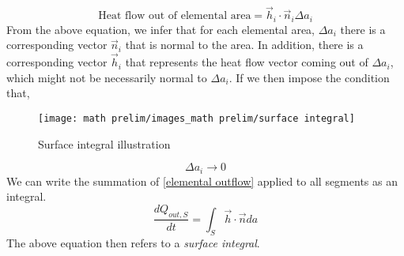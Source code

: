 \begin{equation}
	\label{elemental outflow}
	\text{Heat flow out of elemental area} = \vec{h}_{i} \cdot \vec{n}_{i} \Delta a_{i}
\end{equation}
From the above equation, we infer that for each elemental area, $\Delta a_{i}$ there is a corresponding vector $\vec{n}_{i}$ that is normal to the area. In addition, there is a corresponding vector $\vec{h}_{i}$ that represents the heat flow vector coming out of $\Delta a_{i}$, which might not be necessarily normal to $\Delta a_{i}$. If we then impose the condition that, 
\begin{figure}[H]
    \centering
    \texttt{[image: math prelim/images\_math prelim/surface integral]}
    \caption{Surface integral illustration}
    \label{Surface int pic}
\end{figure}
\begin{equation}
	\Delta a_{i} \to 0 
\end{equation}
We can write the summation of \autoref{elemental outflow} applied to all segments as an integral. 
\begin{equation}
	\frac{d Q_{out, S}}{dt} = \int_{S} \vec{h} \cdot \vec{n} da
\end{equation}
The above equation then refers to a \emph{surface integral}. 
